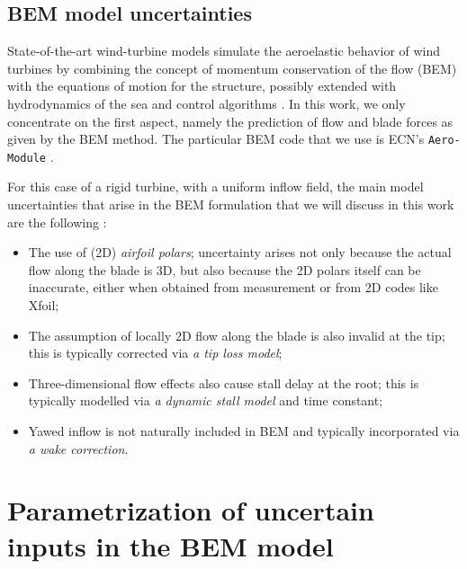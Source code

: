 \documentclass[review]{elsarticle}
\numberwithin{equation}{section}
\numberwithin{equation}{section}
\begin{document}
\subsection{BEM model uncertainties}
State-of-the-art wind-turbine models simulate the aeroelastic behavior of wind turbines by combining the concept of momentum conservation of the flow (BEM) with the equations of motion for the structure, possibly extended with hydrodynamics of the sea and control algorithms \cite{Vorpahl2013}. In this work, we only concentrate on the first aspect, namely the prediction of flow and blade forces as given by the BEM method. The particular BEM code that we use is  ECN's \texttt{Aero-Module} \cite{Boorsma2012}.

For this case of a rigid turbine, with a uniform inflow field, the main model uncertainties that arise in the BEM formulation that we will discuss in this work are the following \cite{Hansen1993}:
\begin{itemize}
\item The use of (2D) \textit{airfoil polars}; uncertainty arises not only because the actual flow along the blade is 3D, but also because the 2D polars itself can be inaccurate, either when obtained from measurement or from 2D codes like Xfoil;
\item The assumption of locally 2D flow along the blade is also invalid at the tip; this is typically corrected via \textit{a tip loss model};
\item Three-dimensional flow effects also cause stall delay at the root; this is typically modelled via \textit{a dynamic stall model }and time constant;
\item Yawed inflow is not naturally included in BEM and typically incorporated via \textit{a wake correction}.


\end{itemize}


\section{Parametrization of uncertain inputs in the BEM model}\label{sec:parameterization}
\end{document}
